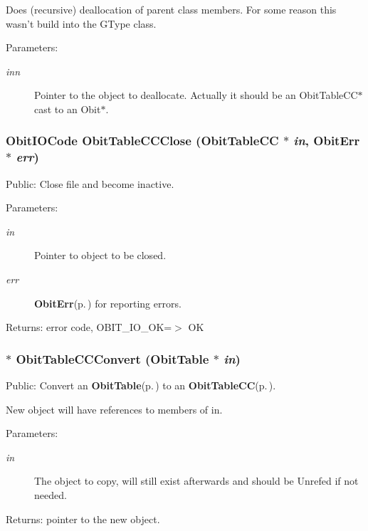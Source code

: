 Does (recursive) deallocation of parent class members. For some reason this wasn't build into the GType class. \begin{Desc}
\item[Parameters:]
\begin{description}
\item[{\em inn}]Pointer to the object to deallocate. Actually it should be an Obit\-Table\-CC$\ast$ cast to an Obit$\ast$. \end{description}
\end{Desc}
\subsubsection{\setlength{\rightskip}{0pt plus 5cm}Obit\-IOCode Obit\-Table\-CCClose ({\bf Obit\-Table\-CC} $\ast$ {\em in}, {\bf Obit\-Err} $\ast$ {\em err})}\label{ObitTableCC_8c_a25}


Public: Close file and become inactive. 

\begin{Desc}
\item[Parameters:]
\begin{description}
\item[{\em in}]Pointer to object to be closed. \item[{\em err}]{\bf Obit\-Err}{\rm (p.\,\pageref{structObitErr})} for reporting errors. \end{description}
\end{Desc}
\begin{Desc}
\item[Returns:]error code, OBIT\_\-IO\_\-OK=$>$ OK \end{Desc}
\subsubsection{$\ast$ Obit\-Table\-CCConvert ({\bf Obit\-Table} $\ast$ {\em in})}\label{ObitTableCC_8c_a19}


Public: Convert an {\bf Obit\-Table}{\rm (p.\,\pageref{structObitTable})} to an {\bf Obit\-Table\-CC}{\rm (p.\,\pageref{structObitTableCC})}. 

New object will have references to members of in. \begin{Desc}
\item[Parameters:]
\begin{description}
\item[{\em in}]The object to copy, will still exist afterwards and should be Unrefed if not needed. \end{description}
\end{Desc}
\begin{Desc}
\item[Returns:]pointer to the new object. \end{Desc}
